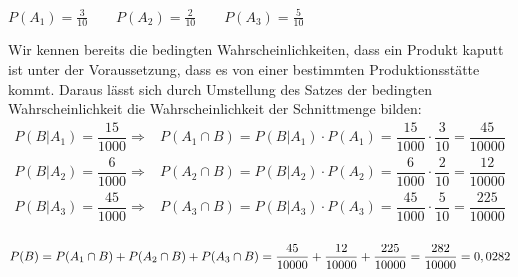 \documentclass[a4paper,10pt]{article}
\begin{document}
	\begin{compactenum} [a)]
		\item \begin{compactenum} [1.]
			\item $ P(A_1) = \frac{3}{10} \qquad P(A_2) = \frac{2}{10} \qquad P(A_3) = \frac{5}{10} $\\
			\item Wir kennen bereits die bedingten Wahrscheinlichkeiten, dass ein Produkt kaputt ist unter der Voraussetzung, dass es von einer bestimmten Produktionsstätte kommt. Daraus lässt sich durch Umstellung des Satzes der bedingten Wahrscheinlichkeit die Wahrscheinlichkeit der Schnittmenge bilden:
			\begin{align*}
				P(B|A_1) = \dfrac{15}{1000} \Rightarrow & P(A_1\cap B) = P(B|A_1)\cdot P(A_1) = \dfrac{15}{1000} \cdot \dfrac{3}{10} = \dfrac{45}{10000}\\
				P(B|A_2) = \dfrac{6}{1000} \Rightarrow & P(A_2\cap B) = P(B|A_2)\cdot P(A_2) = \dfrac{6}{1000} \cdot \dfrac{2}{10} = \dfrac{12}{10000}\\
				P(B|A_3) = \dfrac{45}{1000} \Rightarrow & P(A_3\cap B) = P(B|A_3)\cdot P(A_3) = \dfrac{45}{1000} \cdot \dfrac{5}{10} = \dfrac{225}{10000}\\
			\end{align*}
			\item $ P(B) = P(A_1\cap B) + P(A_2\cap B) + P(A_3\cap B) \\
			= \dfrac{45}{10000} + \dfrac{12}{10000} + \dfrac{225}{10000} = \dfrac{282}{10000} = 0,0282$
		\end{compactenum}
		\item 
	\end{compactenum}
\end{document}
